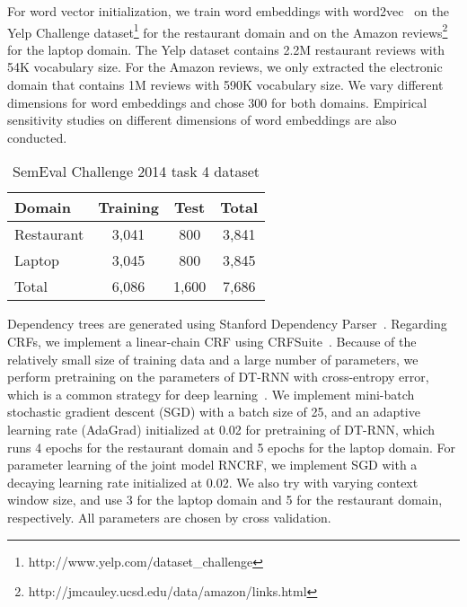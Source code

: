 \documentclass[11pt,letterpaper]{article}
\begin{document}
For word vector initialization, we train word embeddings with word2vec~\cite{DBLP:journals/corr/abs-1301-3781} on the Yelp Challenge dataset\footnote{http://www.yelp.com/dataset\_challenge} for the restaurant domain and on the Amazon reviews\footnote{http://jmcauley.ucsd.edu/data/amazon/links.html}~\cite{Mc15} for the laptop domain. The Yelp dataset contains 2.2M restaurant reviews with 54K vocabulary size. For the Amazon reviews, we only extracted the electronic domain that contains 1M reviews with 590K vocabulary size. We vary different dimensions for word embeddings and chose 300 for both domains. Empirical sensitivity studies on different dimensions of word embeddings are also conducted.
\begin{table}[t]
\footnotesize
	\begin{center}
		\begin{tabular}{l|c|c|c}
			\hline
			\hline Domain     & Training  & Test  & Total \\
			\hline Restaurant & 3,041     & 800   & 3,841 \\
			\hline Laptop     & 3,045     & 800   & 3,845 \\
			\hline Total      & 6,086     & 1,600 & 7,686 \\
			\hline
		\end{tabular}
		\caption{SemEval Challenge 2014 task 4 dataset}\label{tbl:dataset}
	\end{center}
\end{table}
Dependency trees are generated using Stanford Dependency Parser~\cite{Klein03}. Regarding CRFs, we implement a linear-chain CRF using CRFSuite~\cite{CRFsuite}. Because of the relatively small size of training data and a large number of parameters, we perform pretraining on the parameters of DT-RNN with cross-entropy error, which is a common strategy for deep learning~\cite{Erhan09}. We implement mini-batch stochastic gradient descent (SGD) with a batch size of 25, and an adaptive learning rate (AdaGrad) initialized at 0.02 for pretraining of DT-RNN, which runs 4 epochs for the restaurant domain and 5 epochs for the laptop domain. For parameter learning of the joint model RNCRF, we implement SGD with a decaying learning rate initialized at 0.02. We also try with varying context window size, and use 3 for the laptop domain and 5 for the restaurant domain, respectively. All parameters are chosen by cross validation.
\end{document}
